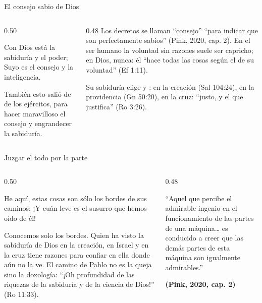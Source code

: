 \begin{frame}{El consejo sabio de Dios}
\begin{columns}[t,onlytextwidth]
\begin{column}{0.50\textwidth}
\begin{cita}[fontupper=\scriptsize\itshape]Con Dios está la sabiduría y el poder; Suyo es el consejo y la inteligencia.\end{cita}
\begin{cita}[fontupper=\scriptsize\itshape]También esto salió de \SENOR{} de los ejércitos, para hacer maravilloso el consejo y engrandecer la sabiduría.\end{cita}
\end{column}
\begin{column}{0.48\textwidth}\scriptsize
Los decretos se llaman ``consejo'' ``para indicar que son perfectamente sabios'' (Pink, 2020, cap. 2). En el ser humano la voluntad sin razones suele ser capricho; en Dios, nunca: él ``hace todas las cosas según el  de su voluntad'' (Ef 1:11).\par\medskip
Su sabiduría elige  y : en la creación (Sal 104:24), en la providencia (Gn 50:20), en la cruz: ``justo, y el que justifica'' (Ro 3:26).
\end{column}
\end{columns}
\end{frame}

\begin{frame}{Juzgar el todo por la parte}
\begin{columns}[t,onlytextwidth]
\begin{column}{0.50\textwidth}
\begin{cita}[fontupper=\scriptsize\itshape]He aquí, estas cosas son sólo los bordes de sus caminos; ¡Y cuán leve es el susurro que hemos oído de él!\end{cita}
\scriptsize Conocemos solo los bordes. Quien ha visto la sabiduría de Dios en la creación, en Israel y en la cruz tiene razones para confiar en ella donde aún no la ve. El camino de Pablo no es la queja sino la doxología: ``¡Oh profundidad de las riquezas de la sabiduría y de la ciencia de Dios!'' (Ro 11:33).
\end{column}
\begin{column}{0.48\textwidth}
\begin{tcolorbox}[colback=papiro,colframe=dorado,boxrule=1.2pt,arc=3pt]
\scriptsize ``Aquel que percibe el admirable ingenio en el funcionamiento de las partes de una máquina\ldots{} es conducido a creer que las demás partes de esta máquina son igualmente admirables.''\par\hfill{\upshape\bfseries(Pink, 2020, cap. 2)}
\end{tcolorbox}
\end{column}
\end{columns}
\end{frame}

